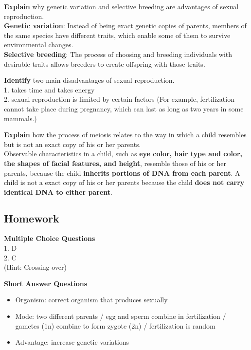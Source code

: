 \documentclass[
]{book}
\providecommand{\tightlist}{%
  \setlength{\itemsep}{0pt}\setlength{\parskip}{0pt}}
\begin{document}
\textbf{Explain} why genetic variation and selective breeding are advantages of sexual reproduction.\\
\textbf{Genetic variation}: Instead of being exact genetic copies of parents, members of the same species have different traits, which enable some of them to survive environmental changes.\\
\textbf{Selective breeding}: The process of choosing and breeding individuals with desirable traits allows breeders to create offspring with those traits.

\textbf{Identify} two main disadvantages of sexual reproduction.\\
1. takes time and takes energy\\
2. sexual reproduction is limited by certain factors (For example, fertilization cannot take place during pregnancy, which can last as long as two years in some mammals.)

\textbf{Explain} how the process of meiosis relates to the way in which a child resembles but is not an exact copy of his or her parents.\\
Observable characteristics in a child, such as \textbf{eye color, hair type and color, the shapes of facial features, and height}, resemble those of his or her parents, because the child \textbf{inherits portions of DNA from each parent}. A child is not a exact copy of his or her parents because the child \textbf{does not carry identical DNA to either parent}.

\hypertarget{homework-3}{%
\subsection{Homework}\label{homework-3}}

\textbf{Multiple Choice Questions}\\
1. D\\
2. C\\
(Hint: Crossing over)

\textbf{Short Answer Questions}

\begin{itemize}
\tightlist
\item
  Organism: correct organism that produces sexually\\
\item
  Mode: two different parents / egg and sperm combine in fertilization / gametes (1n) combine to form zygote (2n) / fertilization is random\\
\item
  Advantage: increase genetic variations
\end{itemize}
\end{document}
